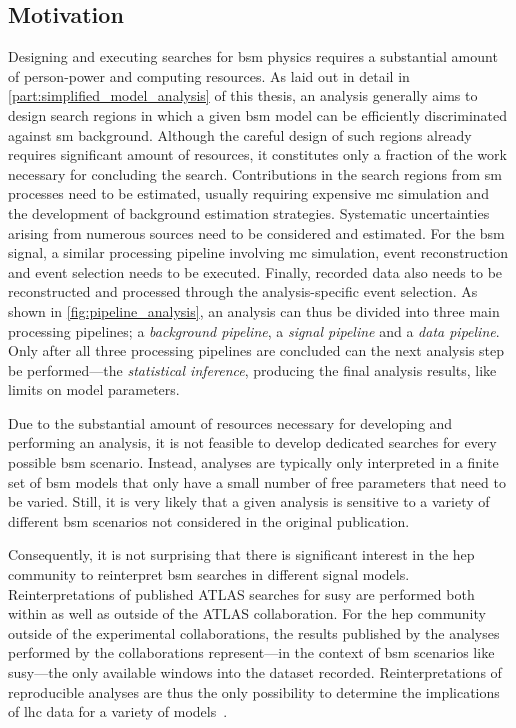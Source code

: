 \subsection{Motivation}
Designing and executing searches for \gls{bsm} physics requires a substantial amount of person-power and computing resources. As laid out in detail in \cref{part:simplified_model_analysis} of this thesis, an analysis generally aims to design search regions in which a given \gls{bsm} model can be efficiently discriminated against \gls{sm} background. Although the careful design of such regions already requires significant amount of resources, it constitutes only a fraction of the work necessary for concluding the search. 
Contributions in the search regions from \gls{sm} processes need to be estimated, usually requiring expensive \gls{mc} simulation and the development of background estimation strategies. Systematic uncertainties arising from numerous sources need to be considered and estimated. 
For the \gls{bsm} signal, a similar processing pipeline involving \gls{mc} simulation, event reconstruction and event selection needs to be executed. Finally, recorded data also needs to be reconstructed and processed through the analysis-specific event selection. 
As shown in \cref{fig:pipeline_analysis}, an analysis can thus be divided into three main processing pipelines; a \textit{background pipeline}, a \textit{signal pipeline} and a \textit{data pipeline}. Only after all three processing pipelines are concluded can the next analysis step be performed---the \textit{statistical inference}, producing the final analysis results, like \eg limits on model parameters.

Due to the substantial amount of resources necessary for developing and performing an analysis, it is not feasible to develop dedicated searches for every possible \gls{bsm} scenario. Instead, analyses are typically only interpreted in a finite set of \gls{bsm} models that only have a small number of free parameters that need to be varied. Still, it is very likely that a given analysis is sensitive to a variety of different \gls{bsm} scenarios not considered in the original publication. 

Consequently, it is not surprising that there is significant interest in the \gls{hep} community to reinterpret \gls{bsm} searches in different signal models. Reinterpretations of published ATLAS searches for \gls{susy} are performed both within as well as outside of the ATLAS collaboration. For the \gls{hep} community outside of the experimental collaborations, the results published by the analyses performed by the collaborations represent---in the context of \gls{bsm} scenarios like \gls{susy}---the only available windows into the dataset recorded. Reinterpretations of reproducible analyses are thus the only possibility to determine the implications of \gls{lhc} data for a variety of models~\cite{reinterpretation_workshop}.


